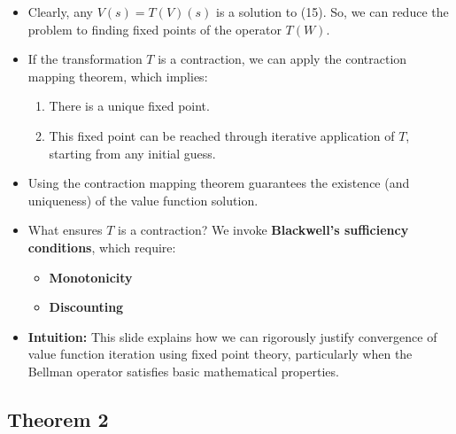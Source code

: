 \documentclass[12pt]{article}
\begin{document}
\begin{itemize}
\item Clearly, any $V(s) = T(V)(s)$ is a solution to (15). So, we can reduce the problem to finding fixed points of the operator $T(W)$.

\item If the transformation $T$ is a contraction, we can apply the contraction mapping theorem, which implies:
\begin{enumerate}
    \item There is a unique fixed point.
    \item This fixed point can be reached through iterative application of $T$, starting from any initial guess.
\end{enumerate}

\item Using the contraction mapping theorem guarantees the existence (and uniqueness) of the value function solution.

\item What ensures $T$ is a contraction? We invoke \textbf{Blackwell’s sufficiency conditions}, which require:
\begin{itemize}
    \item \textbf{Monotonicity}
    \item \textbf{Discounting}
\end{itemize}

\item \textbf{Intuition:} This slide explains how we can rigorously justify convergence of value function iteration using fixed point theory, particularly when the Bellman operator satisfies basic mathematical properties.
\end{itemize}

\subsection*{\noindent\textbf{Theorem 2}}
\end{document}
